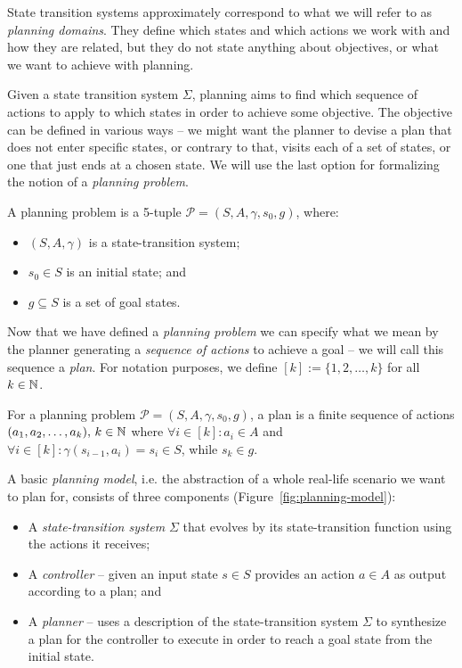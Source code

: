 State transition systems approximately correspond to what we will refer to as \textit{planning domains}.
They define which states and which actions we work with and how they
are related, but they do not state anything about objectives, or what
we want to achieve with planning.

Given a state transition system $\Sigma$, planning aims to find which
sequence of actions to apply to which states in order to achieve some objective.
The objective can be defined in various ways -- we might want the planner
to devise a plan that
does not enter specific states, or contrary to that, visits each of a set of states,
or one that just ends at a chosen state.
We will use the last option for formalizing the notion of a \textit{planning problem}.

\begin{defn}\label{defn:planning-problem}\citep[Part~I]{Ghallab2004}
A planning problem is a 5-tuple $\mathcal{P} = (S, A, \gamma, s_0, g)$, where:
\begin{itemize}
\item $(S, A, \gamma)$ is a state-transition system;
\item $s_0 \in S$ is an initial state; and
\item $g \subseteq S$ is a set of goal states.
\end{itemize}
\end{defn}

Now that we have defined a \textit{planning problem} we can specify what we mean
by the planner generating a \textit{sequence of actions} to achieve a goal -- we will
call this sequence a \textit{plan}.
For notation purposes, we define $[k] := \{1, 2, \ldots, k\}$ for all $k \in \mathbb{N}$.

\begin{defn}[Plan]\label{defn:plan}\citep[Section~1.5]{Ghallab2004}
For a planning problem $\mathcal{P} = (S, A, \gamma, s_0, g)$,
a plan is a finite sequence of actions $(a_1, a_2, \ldots, a_k),\, k \in \mathbb{N}$ where
$\forall i \in [k] : a_i \in A$ and
$\forall i \in [k] : \gamma(s_{i-1}, a_i) = s_i \in S$, while $s_k \in g$.
\end{defn}

A basic \textit{planning model}, i.e. the abstraction of a whole real-life scenario
we want to plan for, consists of three components (Figure~\ref{fig:planning-model}):

\begin{itemize}
\item A \textit{state-transition system} $\Sigma$ that evolves by its state-transition function using the actions
it receives;
\item A \textit{controller} -- given an input state $s \in S$ provides an action $a \in A$ as output according
to a plan; and
\item A \textit{planner} -- uses a description of the state-transition system $\Sigma$ to synthesize a plan for the controller
to execute in order to reach a goal state from the initial state.
\end{itemize}

